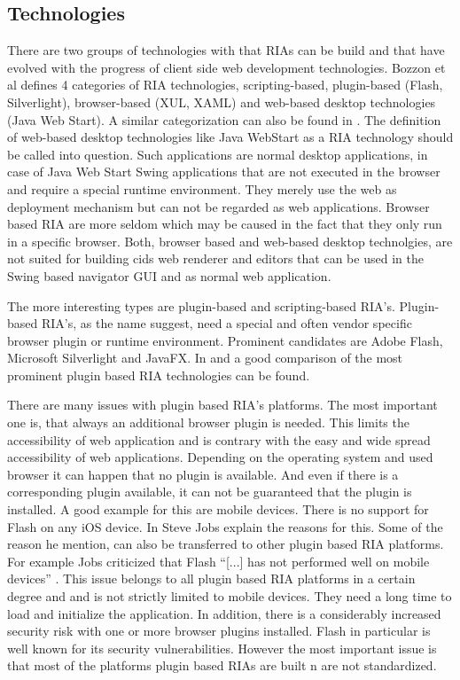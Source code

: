 \subsection{Technologies}

There are two groups of technologies with that RIAs can be build and that have evolved with the progress of client side web development technologies.
Bozzon et al \autocite{ria-classification-1} defines 4 categories of RIA technologies, scripting-based, plugin-based (Flash, Silverlight), browser-based (XUL, XAML) and web-based desktop technologies (Java Web Start).
A similar categorization can also be found in \autocite{ria-classification-2}.
The definition of web-based desktop technologies like Java WebStart as a RIA technology should be called into question.
Such applications are normal desktop applications, in case of Java Web Start Swing applications that are not executed in the browser and require a special runtime environment.
They merely use the web as deployment mechanism but can not be regarded as web applications.
Browser based RIA are more seldom which may be caused in the fact that they only run in a specific browser.
Both, browser based and web-based desktop technolgies,  are not suited for building cids web renderer and editors that can be used in the Swing based navigator GUI and as normal web application.

The more interesting types are plugin-based and scripting-based RIA's.
Plugin-based RIA's, as the name suggest, need a special and often vendor specific browser plugin or runtime environment.
Prominent candidates are Adobe Flash, Microsoft Silverlight and JavaFX.
In \autocite[]{ria-comp-1} and \autocite[]{ria-comp-2} a good comparison of the most prominent plugin based RIA technologies can be found.

There are many issues with plugin based RIA's platforms.
The most important one is, that always an additional browser plugin is needed.
This limits the accessibility of web application and is contrary with the easy and wide spread accessibility of web applications.
Depending on the operating system and used browser it can happen that no plugin is available.
And even if there is a corresponding plugin available, it can not be guaranteed that the plugin is installed.
A good example for this are mobile devices.
There is no support for Flash on any iOS device.
In \autocite[]{jobs-thoughts-on-flash} Steve Jobs explain the reasons for this.
Some of the reason he mention, can also be transferred to other plugin based RIA platforms.
For example Jobs criticized that Flash \enquote{[...] has not performed well on mobile devices} \autocite[]{jobs-thoughts-on-flash}.
This issue belongs to all plugin based RIA platforms in a certain degree and and is not strictly limited to mobile devices.
They need a long time to load and initialize the application.
In addition, there is a considerably increased security risk with one or more browser plugins installed.
Flash in particular is well known for its security vulnerabilities.
However the most important issue is that most of the platforms plugin based RIAs are built n are not standardized.

